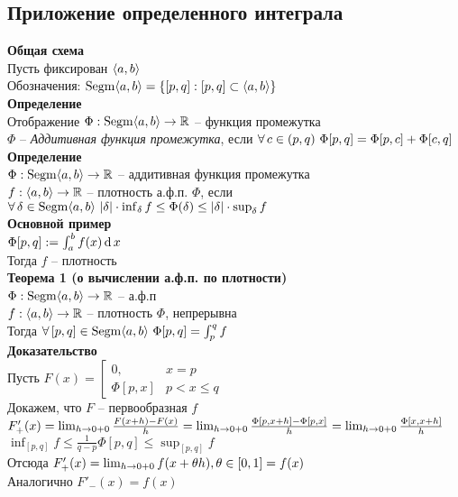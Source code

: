\documentclass[12pt]{article}
\begin{document}
\subsection{Приложение определенного интеграла}
\textbf{Общая схема}\\
Пусть фиксирован $\langle a, b \rangle$\\
Обозначения: $\operatorname{Segm}\langle a, b \rangle = \{ [p,q]: [p,q] \subset \langle a, b \rangle\}$\\
\textbf{Определение}\\
Отображение $\Phi: \operatorname{Segm}\langle a, b \rangle \rightarrow \mathbb{R}$ -- функция промежутка\\
$\Phi$ -- \textit{Аддитивная функция промежутка}, если $\forall\, c \in (p,q)\ \Phi[p,q] = \Phi[p,c] + \Phi[c,q]$\\
\textbf{Определение}\\
$\Phi: \operatorname{Segm}\langle a, b \rangle \rightarrow \mathbb{R}$ -- аддитивная функция промежутка\\
$f: \langle a, b \rangle \rightarrow \mathbb{R}$ -- плотность а.ф.п. $\Phi$, если $\fall \delta \in \nm{Segm}\an ab\ |\delta|\cdot\inf_\delta f \leq \Phi(\delta) \leq |\delta|\cdot\sup_\delta f$\\
\textbf{Основной пример}\\
$\Phi[p,q] := \int_a^b f(x)\operatorname{d} x$\\
Тогда $f$ -- плотность\\
\textbf{Теорема 1 (о вычислении а.ф.п. по плотности)}\\
$\Phi: \operatorname{Segm}\langle a, b \rangle \rightarrow \mathbb{R}$ -- а.ф.п\\
$f: \langle a, b \rangle \rightarrow \mathbb{R}$ -- плотность $\Phi$, непрерывна\\
Тогда $\fall [p,q] \in \nm{Segm}\an ab\ \Phi[p,q] = \int_p^q f$\\
\textbf{Доказательство}\\
Пусть $F(x) = \left[\begin{array}{ll}
     0, & x = p \\
     \Phi[p,x] & p < x \leq q
\end{array}\right.$\\
Докажем, что $F$ -- первообразная $f$\\
$F'_+(x) = \lim_{h \rightarrow 0+0} \frac{F(x+h)-F(x)}{h} = \lim_{h \rightarrow 0+0} \frac{\Phi[p, x+h]-\Phi[p,x]}h = \lim_{h\rightarrow 0+0} \frac{\Phi[x, x+h]}{h}$\\
$\inf_{[p,q]} f \leq \frac{1}{q-p}\Phi[p,q] \leq \sup_{[p,q]} f$\\
Отсюда $F'_+(x) = \lim_{h\rightarrow 0+0} f(x+\theta h), \theta \in [0,1] = f(x)$\\
Аналогично $F'_-(x) = f(x)$\\
\end{document}
